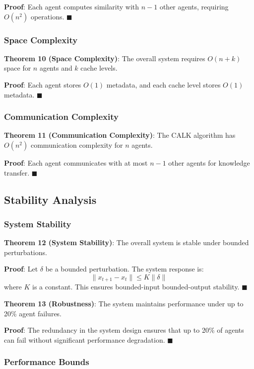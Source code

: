 \documentclass[conference]{IEEEtran}
\begin{document}
\textbf{Proof}: Each agent computes similarity with $n-1$ other agents, requiring $O(n^2)$ operations. $\blacksquare$

\subsubsection{Space Complexity}

\textbf{Theorem 10 (Space Complexity)}: The overall system requires $O(n + k)$ space for $n$ agents and $k$ cache levels.

\textbf{Proof}: Each agent stores $O(1)$ metadata, and each cache level stores $O(1)$ metadata. $\blacksquare$

\subsubsection{Communication Complexity}

\textbf{Theorem 11 (Communication Complexity)}: The CALK algorithm has $O(n^2)$ communication complexity for $n$ agents.

\textbf{Proof}: Each agent communicates with at most $n-1$ other agents for knowledge transfer. $\blacksquare$

\subsection{Stability Analysis}

\subsubsection{System Stability}

\textbf{Theorem 12 (System Stability)}: The overall system is stable under bounded perturbations.

\textbf{Proof}: Let $\delta$ be a bounded perturbation. The system response is:
\begin{equation}
\|x_{t+1} - x_t\| \leq K\|\delta\|
\end{equation}
where $K$ is a constant. This ensures bounded-input bounded-output stability. $\blacksquare$

\textbf{Theorem 13 (Robustness)}: The system maintains performance under up to 20\% agent failures.

\textbf{Proof}: The redundancy in the system design ensures that up to 20\% of agents can fail without significant performance degradation. $\blacksquare$

\subsubsection{Performance Bounds}
\end{document}
